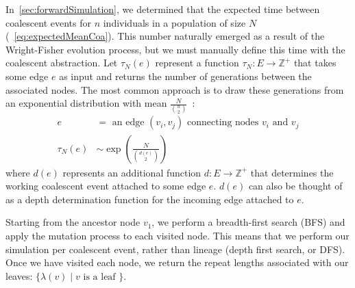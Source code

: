 In~\autoref{sec:forwardSimulation}, we determined that the expected time between coalescent events for $n$ individuals
in a population of size $N$ (~\autoref{eq:expectedMeanCoa}).
This number naturally emerged as a result of the Wright-Fisher evolution process, but we must manually define this time
with the coalescent abstraction.
Let $\tau_N(e)$ represent a function $\tau_N : E \rightarrow \mathbb{Z}^+$ that takes some edge $e$ as input and returns
the number of generations between the associated nodes.
The most common approach is to draw these generations from an exponential distribution with mean
$\frac{N}{\binom{n}{2}}$~\cite{hudsonGeneGenealogiesCoalescent1990}:
\begin{align}
    e &= \text{ an edge } (v_i, v_j) \text{ connecting nodes } v_i \text{ and } v_j \\
    \tau_N(e) &\sim \exp\left(\frac{N}{\binom{d(e)}{2}}\right)
\end{align}
where $d(e)$ represents an additional function $d : E \rightarrow \mathbb{Z}^+$ that determines the working coalescent
event attached to some edge $e$.
$d(e)$ can also be thought of as a depth determination function for the incoming edge attached to $e$.

Starting from the ancestor node $v_1$, we perform a breadth-first search (BFS) and apply the mutation process to each
visited node.
This means that we perform our simulation per coalescent event, rather than lineage (depth first search, or DFS).
Once we have visited each node, we return the repeat lengths associated with our leaves: $\{ \lambda (v) \mid v
\text{ is a leaf }\}$.

